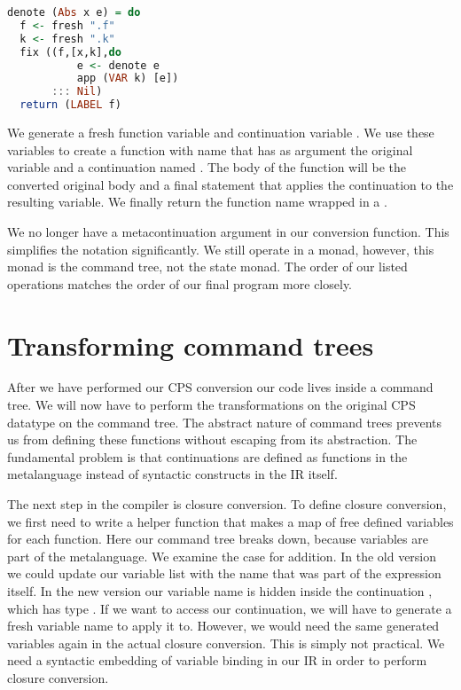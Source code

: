 \begin{lstlisting}[language=Haskell]
denote (Abs x e) = do
  f <- fresh ".f"
  k <- fresh ".k"
  fix ((f,[x,k],do
           e <- denote e
           app (VAR k) [e])
       ::: Nil)
  return (LABEL f)
\end{lstlisting}

We generate a fresh function variable  and continuation variable . We use these variables to create a function with name  that has as argument the original variable and a continuation named . The body of the function will be the converted original body and a final statement that applies the continuation to the resulting variable. We finally return the function name wrapped in a .

We no longer have a metacontinuation argument in our conversion function. This simplifies the notation significantly. We still operate in a monad, however, this monad is the command tree, not the state monad. The order of our listed operations matches the order of our final program more closely.


\section{\label{section:transcomtree}Transforming command trees}
After we have performed our \ac{CPS} conversion our code lives inside a command tree. We will now have to perform the transformations on the original \ac{CPS} datatype on the command tree. The abstract nature of command trees prevents us from defining these functions without escaping from its abstraction. The fundamental problem is that continuations are defined as functions in the metalanguage instead of syntactic constructs in the \ac{IR} itself.

The next step in the compiler is closure conversion. To define closure conversion, we first need to write a helper function that makes a map of free defined variables for each function. Here our command tree breaks down, because variables are part of the metalanguage. We examine the case for addition. In the old version we could update our variable list with the name  that was part of the  expression itself. In the new version our variable name is hidden inside the continuation , which has type . If we want to access our continuation, we will have to generate a fresh variable name to apply it to. However, we would need the same generated variables again in the actual closure conversion. This is simply not practical. We need a syntactic embedding of variable binding in our \ac{IR} in order to perform closure conversion.

